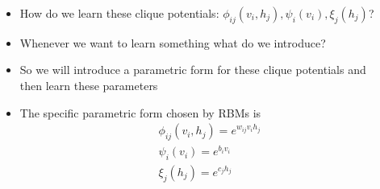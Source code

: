 \begin{frame}
\begin{columns}
\begin{overlayarea}{\textwidth}{\textheight}
		\end{overlayarea}
		\begin{overlayarea}{\textwidth}{\textheight}
			\begin{itemize}\justifying
				\item<1-> How do we learn these clique potentials: $\phi_{ij}(v_i, h_j), \psi_i(v_i), \xi_j(h_j)$?
				\item<2->  Whenever we want to learn something what do we introduce? \onslide<3->{(parameters)}
				\item<4-> So we will introduce a parametric form for these clique potentials and then learn these parameters
				\item<5-> The specific parametric form chosen by RBMs is 
				\begin{align*}
					&\phi_{ij}(v_i, h_j) = e^{w_{ij} v_i h_j}\\
					&\psi_i(v_i) = e^{b_i v_i}\\
					&\xi_j(h_j) = e^{c_j h_j}\\
				\end{align*}
			\end{itemize}
		\end{overlayarea}
	\end{columns}
\end{frame}


